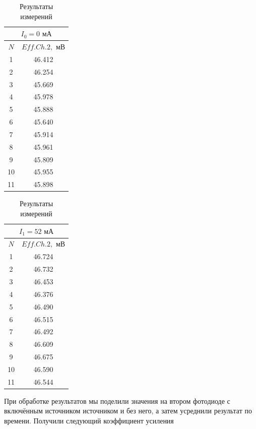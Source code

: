 \documentclass[a4paper,12pt]{article} %
\begin{document}
\begin{enumerate}
    \begin{table}[h]
        \centering
        \begin{tabular}{|c|c|}
        \hline
            \multicolumn{2}{|c|}{$I_0=0\text{ мА}$} \\ \hline
        \hline
    	$N$ & $Eff.Ch.2, \text{ мВ}$ \\ \hline
            1 & 46.412 \\ \hline
            2 & 46.254 \\ \hline
            3 & 45.669 \\ \hline
            4 & 45.978 \\ \hline
            5 & 45.888 \\ \hline
            6 & 45.640 \\ \hline
            7 & 45.914 \\ \hline
            8 & 45.961 \\ \hline
            9 & 45.809 \\ \hline
            10 & 45.955 \\ \hline
            11 & 45.898 \\ \hline
        \end{tabular}
        \begin{tabular}{|c|c|}
        \hline
            \multicolumn{2}{|c|}{$I_1=52\text{ мА}$} \\ \hline
        \hline
    	$N$ & $Eff.Ch.2, \text{ мВ}$ \\ \hline
            1 & 46.724 \\ \hline
            2 & 46.732 \\ \hline
            3 & 46.453 \\ \hline
            4 & 46.376 \\ \hline
            5 & 46.490 \\ \hline
            6 & 46.515 \\ \hline
            7 & 46.492 \\ \hline
            8 & 46.609 \\ \hline
            9 & 46.675 \\ \hline
            10 & 46.590 \\ \hline
            11 & 46.544 \\ \hline
        \end{tabular}
    \caption{Результаты измерений}
    \label{tab1}
    \end{table}

    При обработке результатов мы поделили значения на втором фотодиоде с включённым источником источником и без него, а затем усреднили результат по времени. Получили следующий коэффициент усиления


\end{enumerate}
\end{document}
